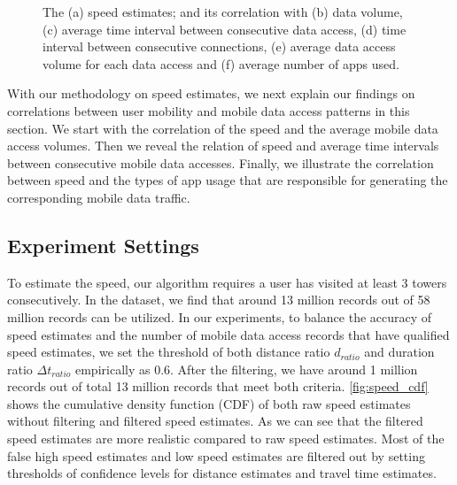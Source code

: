 \begin{figure}
    \vspace{-0.1in}
    \caption{The (a) speed estimates; and its correlation with (b) data volume, (c) average time interval between consecutive data access, (d) time interval between consecutive connections, (e) average data access volume for each data access and (f) average number of apps used.}
    \label{fig:speed_corr}
\end{figure}

With our methodology on speed estimates, we next explain our findings on correlations between user mobility and mobile data access patterns in this section. We start with the correlation of the speed and the average mobile data access volumes. Then we reveal the relation of speed and average time intervals between consecutive mobile data accesses. Finally, we illustrate the correlation between speed and the types of app usage that are responsible for generating the corresponding mobile data traffic.

\subsection{Experiment Settings}

To estimate the speed, our algorithm requires a user has visited at least 3 towers consecutively. In the dataset, we find that around 13 million records out of 58 million records can be utilized. In our experiments, to balance the accuracy of speed estimates and the number of mobile data access records that have qualified speed estimates, we set the threshold of both distance ratio $d_{ratio}$ and duration ratio $\Delta t_{ratio}$ empirically as 0.6. After the filtering, we have around 1 million records out of total 13 million records that meet both criteria. \autoref{fig:speed_cdf} shows the cumulative density function (CDF) of both raw speed estimates without filtering and filtered speed estimates. As we can see that the filtered speed estimates are more realistic compared to raw speed estimates. Most of the false high speed estimates and low speed estimates are filtered out by setting thresholds of confidence levels for distance estimates and travel time estimates.

